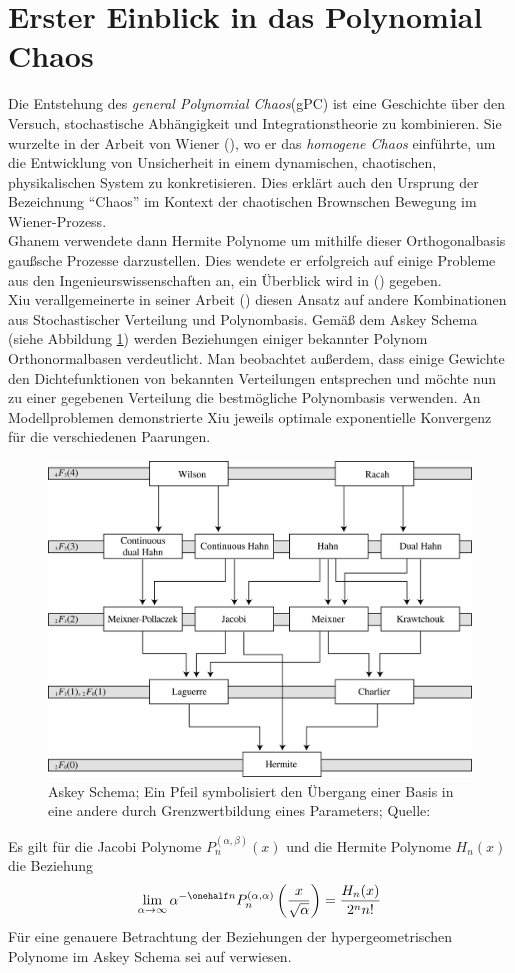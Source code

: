 \section{Erster Einblick in das Polynomial Chaos}
Die Entstehung des \emph{general Polynomial Chaos}(gPC) ist eine Geschichte über den Versuch, stochastische Abhängigkeit und Integrationstheorie zu kombinieren. Sie wurzelte in der Arbeit von Wiener (\autocite{norbertwiener1938}), wo er das \emph{homogene Chaos} einführte, um die Entwicklung von Unsicherheit in einem dynamischen, chaotischen, physikalischen System zu konkretisieren. Dies erklärt auch den Ursprung der Bezeichnung "`Chaos"' im Kontext der chaotischen Brownschen Bewegung im Wiener-Prozess.\\
Ghanem verwendete dann Hermite Polynome um mithilfe dieser Orthogonalbasis gaußsche Prozesse darzustellen. Dies wendete er erfolgreich auf einige Probleme aus den Ingenieurswissenschaften an, ein Überblick wird in (\autocite{GhaSpa91}) gegeben.\\
Xiu verallgemeinerte in seiner Arbeit (\autocite{xiu2002}) diesen Ansatz auf andere Kombinationen aus Stochastischer Verteilung und Polynombasis. Gemäß dem Askey Schema (siehe Abbildung \ref{askeyscheme}) werden Beziehungen einiger bekannter Polynom Orthonormalbasen verdeutlicht. Man beobachtet außerdem, dass einige Gewichte den Dichtefunktionen von bekannten Verteilungen entsprechen und möchte nun zu einer gegebenen Verteilung die bestmögliche Polynombasis verwenden. An Modellproblemen demonstrierte Xiu jeweils optimale exponentielle Konvergenz für die verschiedenen Paarungen.\\
\begin{figure}
\center
\includegraphics[width=0.8\linewidth]{Figures/askeyscheme.png}
\caption{Askey Schema; Ein Pfeil symbolisiert den Übergang einer Basis in eine andere durch Grenzwertbildung eines Parameters; Quelle: \autocite{webaskey}}
\label{askeyscheme}
\end{figure}
\begin{mathbsp}
Es gilt für die Jacobi Polynome $P_n^{(\alpha,\beta)}(x)$ und die Hermite Polynome $H_n(x)$ die Beziehung
\[\lim\limits_{\alpha\to\infty}\alpha^{-\onehalf n}P_n^{(\alpha,\alpha)}\left(\frac{x}{\sqrt{\alpha}}\right)=\frac{H_n(x)}{2^nn!}\]
Für eine genauere Betrachtung der Beziehungen der hypergeometrischen Polynome im Askey Schema sei auf \autocite{koekoekswart98} verwiesen.
\end{mathbsp}

